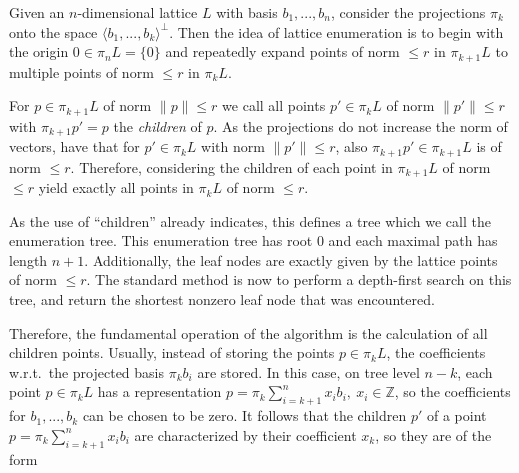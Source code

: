 \documentclass{scrartcl}
\newcommand{\Z}{\mathbb{Z}}
\begin{document}
    Given an $n$-dimensional lattice $L$ with basis $b_1, ..., b_n$, consider the projections $\pi_k$ onto the space $\langle b_1, ..., b_k \rangle^\perp$. 
    Then the idea of lattice enumeration is to begin with the origin $0 \in \pi_n L = \{ 0 \}$ and repeatedly expand points of norm $\leq r$ in $\pi_{k + 1} L$ to multiple points of norm $\leq r$ in $\pi_k L$.
    
    For $p \in \pi_{k + 1} L$ of norm $\| p \| \leq r$ we call all points $p' \in \pi_k L$ of norm $\| p' \| \leq r$ with $\pi_{k + 1} p' = p$ the \emph{children} of $p$. 
    As the projections do not increase the norm of vectors, have that for $p' \in \pi_k L$ with norm $\| p' \| \leq r$, also $\pi_{k + 1} p' \in \pi_{k + 1}L$ is of norm $\leq r$. 
    Therefore, considering the children of each point in $\pi_{k + 1}L$ of norm $\leq r$ yield exactly all points in $\pi_k L$ of norm $\leq r$.

    As the use of ``children'' already indicates, this defines a tree which we call the enumeration tree. This enumeration tree has root $0$ and each maximal path has length $n + 1$. Additionally, the leaf nodes are exactly given by the lattice points of norm $\leq r$.
    The standard method is now to perform a depth-first search on this tree, and return the shortest nonzero leaf node that was encountered.

    Therefore, the fundamental operation of the algorithm is the calculation of all children points. Usually, instead of storing the points $p \in \pi_k L$, the coefficients w.r.t.\ the projected basis $\pi_k b_i$ are stored. 
    In this case, on tree level $n - k$, each point $p \in \pi_k L$ has a representation $p = \pi_k \sum_{i = k + 1}^n x_i b_i , \ x_i \in \Z$, so the coefficients for $b_1, ..., b_k$ can be chosen to be zero. 
    It follows that the children $p'$ of a point $p = \pi_k \sum_{i = k + 1}^n x_i b_i$ are characterized by their coefficient $x_k$, so they are of the form
    
\end{document}
